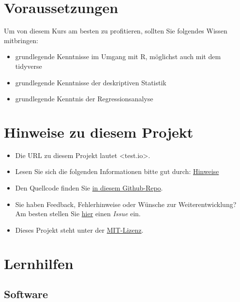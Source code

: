 \documentclass[
]{book}
\providecommand{\tightlist}{%
  \setlength{\itemsep}{0pt}\setlength{\parskip}{0pt}}
\begin{document}
\hypertarget{voraussetzungen}{%
\section{Voraussetzungen}\label{voraussetzungen}}

Um von diesem Kurs am besten zu profitieren,
sollten Sie folgendes Wissen mitbringen:

\begin{itemize}
\tightlist
\item
  grundlegende Kenntnisse im Umgang mit R, möglichst auch mit dem tidyverse
\item
  grundlegende Kenntnisse der deskriptiven Statistik
\item
  grundlegende Kenntnis der Regressionsanalyse
\end{itemize}

\hypertarget{hinweise-zu-diesem-projekt}{%
\section{Hinweise zu diesem Projekt}\label{hinweise-zu-diesem-projekt}}

\begin{itemize}
\item
  Die URL zu diesem Projekt lautet \textless test.io\textgreater.
\item
  Lesen Sie sich die folgenden Informationen bitte gut durch: \href{https://sebastiansauer.github.io/fopra/Interna/Hinweise.html}{Hinweise}
\item
  Den Quellcode finden Sie \href{https://github.com/sebastiansauer/datascience1}{in diesem Github-Repo}.
\item
  Sie haben Feedback, Fehlerhinweise oder Wünsche zur Weiterentwicklung? Am besten stellen Sie \href{https://github.com/sebastiansauer/datascience1/issues}{hier} einen \emph{Issue} ein.
\item
  Dieses Projekt steht unter der \href{https://github.com/sebastiansauer/datascience1/blob/main/LICENSE}{MIT-Lizenz}.
\end{itemize}

\hypertarget{lernhilfen}{%
\section{Lernhilfen}\label{lernhilfen}}

\hypertarget{software}{%
\subsection{Software}\label{software}}
\end{document}
